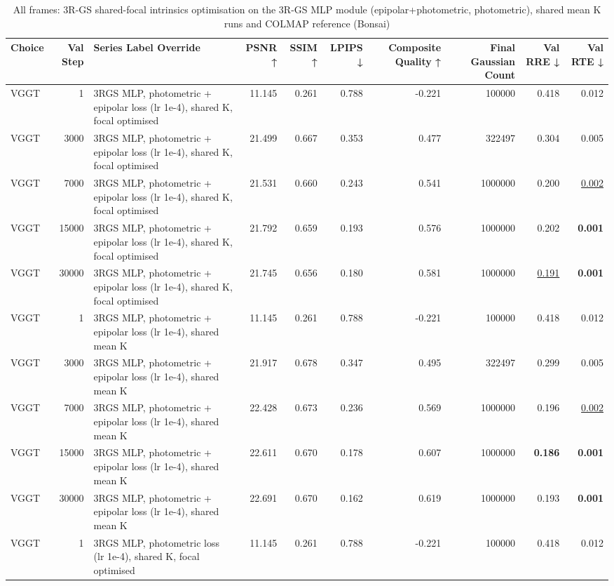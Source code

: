 \begin{table}[H]
\caption{\ifdefined\customcaption \customcaption \else All frames: 3R-GS shared-focal intrinsics optimisation on the 3R-GS MLP module (epipolar+photometric, photometric), shared mean K runs and COLMAP reference (Bonsai) \fi}
\label{tab:121_omega_epi_intropt_3rgs_bonsai}
\centering
\tiny
\begin{tabular}{lrlrrrrrrr}
\toprule
Choice & Val Step & Series Label Override & PSNR ↑ & SSIM ↑ & LPIPS ↓ & Composite Quality ↑ & Final Gaussian Count & Val RRE ↓ & Val RTE ↓ \\
\midrule
VGGT & 1 & 3RGS MLP, photometric + epipolar loss (lr 1e-4), shared K, focal optimised & 11.145 & 0.261 & 0.788 & -0.221 & 100000 & 0.418 & 0.012 \\
VGGT & 3000 & 3RGS MLP, photometric + epipolar loss (lr 1e-4), shared K, focal optimised & 21.499 & 0.667 & 0.353 & 0.477 & 322497 & 0.304 & 0.005 \\
VGGT & 7000 & 3RGS MLP, photometric + epipolar loss (lr 1e-4), shared K, focal optimised & 21.531 & 0.660 & 0.243 & 0.541 & 1000000 & 0.200 & \underline{0.002} \\
VGGT & 15000 & 3RGS MLP, photometric + epipolar loss (lr 1e-4), shared K, focal optimised & 21.792 & 0.659 & 0.193 & 0.576 & 1000000 & 0.202 & \textbf{0.001} \\
VGGT & 30000 & 3RGS MLP, photometric + epipolar loss (lr 1e-4), shared K, focal optimised & 21.745 & 0.656 & 0.180 & 0.581 & 1000000 & \underline{0.191} & \textbf{0.001} \\
VGGT & 1 & 3RGS MLP, photometric + epipolar loss (lr 1e-4), shared mean K & 11.145 & 0.261 & 0.788 & -0.221 & 100000 & 0.418 & 0.012 \\
VGGT & 3000 & 3RGS MLP, photometric + epipolar loss (lr 1e-4), shared mean K & 21.917 & 0.678 & 0.347 & 0.495 & 322497 & 0.299 & 0.005 \\
VGGT & 7000 & 3RGS MLP, photometric + epipolar loss (lr 1e-4), shared mean K & 22.428 & 0.673 & 0.236 & 0.569 & 1000000 & 0.196 & \underline{0.002} \\
VGGT & 15000 & 3RGS MLP, photometric + epipolar loss (lr 1e-4), shared mean K & 22.611 & 0.670 & 0.178 & 0.607 & 1000000 & \textbf{0.186} & \textbf{0.001} \\
VGGT & 30000 & 3RGS MLP, photometric + epipolar loss (lr 1e-4), shared mean K & 22.691 & 0.670 & 0.162 & 0.619 & 1000000 & 0.193 & \textbf{0.001} \\
VGGT & 1 & 3RGS MLP, photometric loss (lr 1e-4), shared K, focal optimised & 11.145 & 0.261 & 0.788 & -0.221 & 100000 & 0.418 & 0.012 \\

\end{tabular}
\end{table}
